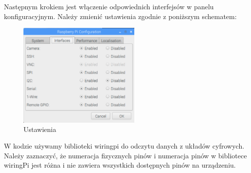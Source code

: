 Następnym krokiem jest włączenie odpowiednich interfejsów w panelu konfiguracyjnym. Należy zmienić ustawienia zgodnie z poniższym schematem:

\begin{figure}[h]
	\centering
	\includegraphics[width=6cm]{RSettings}
	\caption{Ustawienia}
\end{figure}

W kodzie używamy biblioteki wiringpi do odczytu danych z układów cyfrowych. Należy zaznaczyć, że numeracja fizycznych pinów i numeracja pinów w bibliotece wiringPi jest różna i nie zawiera wszystkich dostępnych pinów na urządzeniu. 

